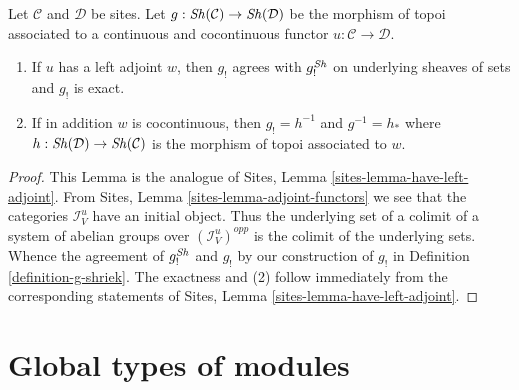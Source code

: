 \begin{lemma}
\label{lemma-have-left-adjoint}
Let $\mathcal{C}$ and $\mathcal{D}$ be sites. Let
$g : \mathop{\mathit{Sh}}\nolimits(\mathcal{C}) \to \mathop{\mathit{Sh}}\nolimits(\mathcal{D})$ be the morphism of topoi
associated to a continuous and cocontinuous functor
$u : \mathcal{C} \to \mathcal{D}$.
\begin{enumerate}
\item If $u$ has a left adjoint $w$, then $g_!$ agrees with $g_!^{\mathop{\mathit{Sh}}\nolimits}$
on underlying sheaves of sets and $g_!$ is exact.
\item If in addition $w$ is cocontinuous, then $g_! = h^{-1}$ and
$g^{-1} = h_*$ where
$h : \mathop{\mathit{Sh}}\nolimits(\mathcal{D}) \to \mathop{\mathit{Sh}}\nolimits(\mathcal{C})$ is the morphism of topoi
associated to $w$.
\end{enumerate}
\end{lemma}

\begin{proof}
This Lemma is the analogue of
Sites, Lemma \ref{sites-lemma-have-left-adjoint}.
From Sites, Lemma \ref{sites-lemma-adjoint-functors} we see that the categories
$\mathcal{I}_V^u$ have an initial object. Thus the underlying set of a
colimit of a system of abelian groups over $(\mathcal{I}_V^u)^{opp}$
is the colimit of the underlying sets. Whence the agreement
of $g_!^{\mathop{\mathit{Sh}}\nolimits}$ and $g_!$ by our construction of $g_!$ in
Definition \ref{definition-g-shriek}.
The exactness and (2) follow immediately from the corresponding statements of
Sites, Lemma \ref{sites-lemma-have-left-adjoint}.
\end{proof}





\section{Global types of modules}
\label{section-global}

